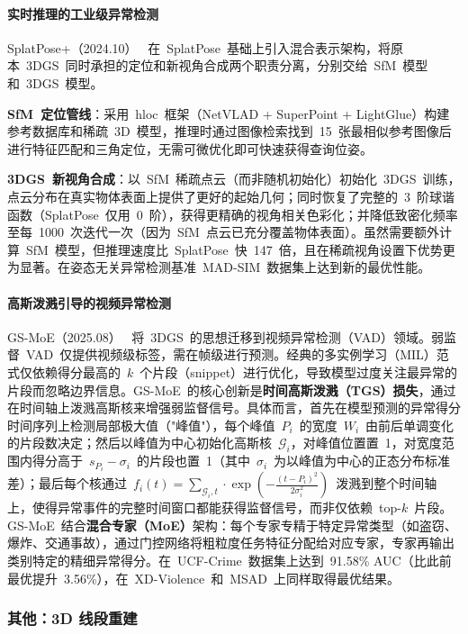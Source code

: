 \paragraph{实时推理的工业级异常检测}

SplatPose+（2024.10）~\cite{2410_12080} 在~SplatPose~基础上引入混合表示架构，将原本~3DGS~同时承担的定位和新视角合成两个职责分离，分别交给~SfM~模型和~3DGS~模型。

\textbf{SfM~定位管线}：采用~hloc~框架（NetVLAD + SuperPoint + LightGlue）构建参考数据库和稀疏~3D~模型，推理时通过图像检索找到~15~张最相似参考图像后进行特征匹配和三角定位，无需可微优化即可快速获得查询位姿。

\textbf{3DGS~新视角合成}：以~SfM~稀疏点云（而非随机初始化）初始化~3DGS~训练，点云分布在真实物体表面上提供了更好的起始几何；同时恢复了完整的~3~阶球谐函数（SplatPose~仅用~0~阶），获得更精确的视角相关色彩化；并降低致密化频率至每~1000~次迭代一次（因为~SfM~点云已充分覆盖物体表面）。虽然需要额外计算~SfM~模型，但推理速度比~SplatPose~快~147~倍，且在稀疏视角设置下优势更为显著。在姿态无关异常检测基准~MAD-SIM~数据集上达到新的最优性能。

\paragraph{高斯泼溅引导的视频异常检测}

GS-MoE（2025.08）~\cite{2508_06318} 将~3DGS~的思想迁移到视频异常检测（VAD）领域。弱监督~VAD~仅提供视频级标签，需在帧级进行预测。经典的多实例学习（MIL）范式仅依赖得分最高的~$k$~个片段（snippet）进行优化，导致模型过度关注最异常的片段而忽略边界信息。GS-MoE~的核心创新是\textbf{时间高斯泼溅（TGS）损失}，通过在时间轴上泼溅高斯核来增强弱监督信号。具体而言，首先在模型预测的异常得分时间序列上检测局部极大值（"峰值"），每个峰值~$P_i$~的宽度~$W_i$~由前后单调变化的片段数决定；然后以峰值为中心初始化高斯核~$\mathcal{G}_i$，对峰值位置置~1，对宽度范围内得分高于~$s_{P_i} - \sigma_i$~的片段也置~1（其中~$\sigma_i$~为以峰值为中心的正态分布标准差）；最后每个核通过~$f_i(t) = \sum_{\mathcal{G}_i,t} \cdot \exp(-\frac{(t-P_i)^2}{2\sigma_i^2})$~泼溅到整个时间轴上，使得异常事件的完整时间窗口都能获得监督信号，而非仅依赖~top-$k$~片段。GS-MoE~结合\textbf{混合专家（MoE）}架构：每个专家专精于特定异常类型（如盗窃、爆炸、交通事故），通过门控网络将粗粒度任务特征分配给对应专家，专家再输出类别特定的精细异常得分。在~UCF-Crime~数据集上达到~91.58\% AUC（比此前最优提升~3.56\%），在~XD-Violence~和~MSAD~上同样取得最优结果。

\subsubsection{其他：3D 线段重建}

